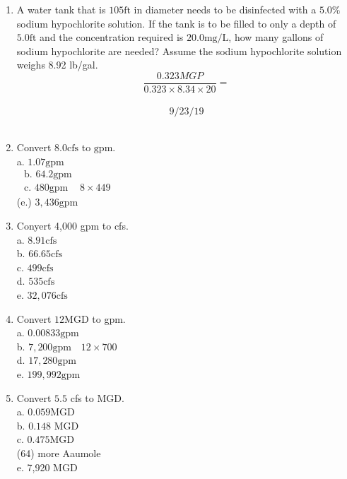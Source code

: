 \documentclass{article}
\begin{document}
\begin{enumerate}
\item A water tank that is $105 \mathrm{ft}$ in diameter needs to be disinfected with a $5.0 \%$ sodium hypochlorite solution. If the tank is to be filled to only a depth of $5.0 \mathrm{ft}$ and the concentration required is $20.0 \mathrm{mg} / \mathrm{L}$, how many gallons of sodium hypochlorite are needed? Assume the sodium hypochlorite solution weighs 8.92 lb/gal.\\
$$\frac{0.323 M G P}{0.323 \times 8.34 \times 20}=$$\\
$$9 / 23 / 19$$\\

\item Convert $8.0 \mathrm{cfs}$ to $\mathrm{gpm}$.\\
a. $1.07 \mathrm{gpm}$\\
$\begin{array}{ll}\text { b. } 64.2 \mathrm{gpm} \\ \text { c. } 480 \mathrm{gpm} & 8 \times 449\end{array}$\\
(e.) $3,436 \mathrm{gpm}$\\

\item Conyert 4,000 gpm to cfs.\\
a.  $8.91 \mathrm{cfs}$\\
b. $66.65 \mathrm{cfs}$\\
c. $499 \mathrm{cfs}$\\
d. $535 \mathrm{cfs}$\\
e. $32,076 \mathrm{cfs}$\\

\item Convert $12 \mathrm{MGD}$ to gpm.\\
a. $0.00833 \mathrm{gpm}$\\
b. $7,200 \mathrm{gpm} \quad 12 \times 700$\\
d. $17,280 \mathrm{gpm}$\\
e. $199,992 \mathrm{gpm}$\\

\item Convert $5.5$ cfs to MGD.\\
a. $0.059 \mathrm{MGD}$\\
b. $0.148$ MGD\\
c. $0.475 \mathrm{MGD}$\\
(64) more Aaumole\\
e. 7,920 MGD\\


\end{enumerate}
\end{document}
